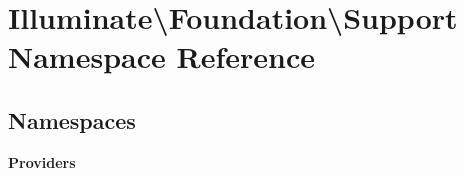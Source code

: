\section{Illuminate\textbackslash{}Foundation\textbackslash{}Support Namespace Reference}
\label{namespace_illuminate_1_1_foundation_1_1_support}
\subsection*{Namespaces}
\begin{DoxyCompactItemize}
\item 
 {\bf Providers}
\end{DoxyCompactItemize}
